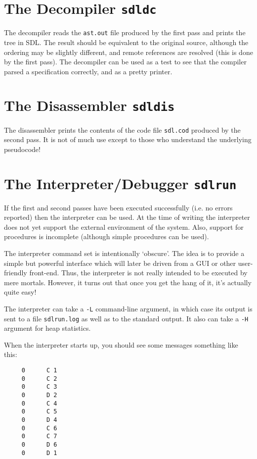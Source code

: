 \section{The Decompiler {\tt sdldc}}

The decompiler reads the {\tt ast.out} file produced by the first
pass and prints the tree in SDL. The result should be equivalent to
the original source, although the ordering may be slightly different,
and remote references are resolved (this is done by the first pass).
The decompiler can be used as a test to see that the compiler
parsed a specification correctly, and as a pretty printer.

\section{The Disassembler {\tt sdldis}}

The disassembler prints the contents of the code file {\tt sdl.cod}
produced by the second pass. It is not of much use except to those
who understand the underlying pseudocode!

\section{The Interpreter/Debugger {\tt sdlrun}}

If the first and second passes have been executed successfully (i.e.
no errors reported) then the interpreter can be used. At the time of
writing the interpreter does not yet support the external 
environment of the system. Also, support for procedures is
incomplete (although simple procedures can be used).

The interpreter command set is intentionally `obscure'. The idea
is to provide a simple but powerful interface which will later be
driven from a GUI or other user-friendly front-end. Thus, the
interpreter is not really intended to be executed by mere mortals.
However, it turns out that once you get the hang of it, it's actually
quite easy!

The interpreter can take a {\tt -L} command-line argument, in which 
case its output is sent to a file {\tt sdlrun.log} as well as to the
standard output. It also can take a {\tt -H} argument for heap 
statistics.

When the interpreter starts up, you should see some messages
something like this:

\begin{verbatim}
     0      C 1  
     0      C 2  
     0      C 3  
     0      D 2  
     0      C 4  
     0      C 5  
     0      D 4  
     0      C 6  
     0      C 7  
     0      D 6  
     0      D 1  
\end{verbatim}

